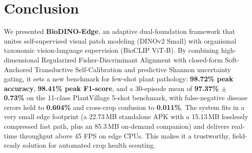 \documentclass[conference]{IEEEtran}
\begin{document}
\section{Conclusion}
We presented \textbf{BioDINO-Edge}, an adaptive dual-foundation framework that unites self-supervised visual patch modeling (DINOv2 Small) with organismal taxonomic vision-language supervision (BioCLIP ViT-B). By combining high-dimensional Regularized Fisher-Discriminant Alignment with closed-form Soft-Anchored Transductive Self-Calibration and predictive Shannon uncertainty gating, it sets a new benchmark for few-shot plant pathology: \textbf{98.72\% peak accuracy}, \textbf{98.41\% peak F1-score}, and a 30-episode mean of \textbf{97.37\% $\pm$ 0.73\%} on the 11-class PlantVillage 5-shot benchmark, with false-negative disease errors held to \textbf{0.604\%} and cross-crop confusion to \textbf{0.011\%}. The system fits in a very small edge footprint (a 22.73\,MB standalone APK with a 15.13\,MB losslessly compressed fast path, plus an 85.3\,MB on-demand companion) and delivers real-time throughput above 45 FPS on edge CPUs. This makes it a trustworthy, field-ready solution for automated crop health scouting.

\makeatletter
\def\thebibliography#1{\section*{\refname}%
    \addcontentsline{toc}{section}{\refname}%
    \scriptsize\vskip 0.2\baselineskip%
    \list{\@biblabel{\@arabic\c@enumiv}}%
    {\settowidth\labelwidth{\@biblabel{#1}}%
    \leftmargin\labelwidth
    \advance\leftmargin\labelsep\relax
    \itemsep 0.5pt\relax
    \parsep 0pt\relax
    \usecounter{enumiv}%
    \let\p@enumiv\@empty
    \renewcommand\theenumiv{\@arabic\c@enumiv}}%
    \let\@IEEElatexbibitem\bibitem%
    \def\bibitem{\@IEEEbibitemprefix\@IEEElatexbibitem}%
\def\newblock{\hskip .11em plus .33em minus .07em}}
\makeatother



\end{document}
